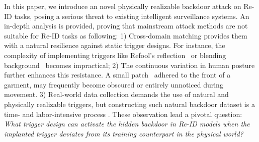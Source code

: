 \documentclass[sigconf,authordraft]{acmart}
\begin{document}
In this paper, we introduce an novel physically realizable backdoor attack on Re-ID tasks, posing a serious threat to existing intelligent surveillance systems. An in-depth analysis is provided, proving that mainstream attack methods are not suitable for Re-ID tasks as following:
1) Cross-domain matching provides them with a natural resilience against static trigger designs. For instance, the complexity of implementing triggers like Refool’s reflection~\cite{liu2020reflection} or blending background~\cite{chen2017targeted} becomes impractical; 2) The continuous variation in human posture further enhances this resistance. A small patch~\cite{Gu2017BadNetsIV,liu2018trojaning} adhered to the front of a garment, may frequently become obscured or entirely unnoticed during movement. 3) Real-world data collection demands the use of natural and physically realizable triggers, but constructing such natural backdoor dataset is a time- and labor-intensive process \cite{wenger2022finding}.  These observation lead a pivotal question: \textit{What trigger design can activate the hidden backdoor in Re-ID models when the implanted trigger deviates from its training counterpart in the physical world?}
\end{document}
